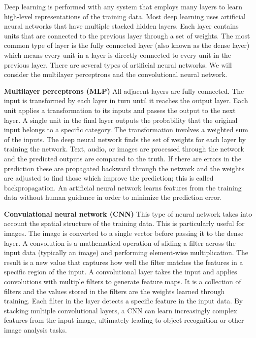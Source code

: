 \documentclass[10pt, letterpaper, twoside]{article}
\begin{document}
Deep learning is performed with any system that employs many layers to learn high-level representations of the training data. Most deep learning uses artificial neural networks that have multiple stacked hidden layers. Each layer contains units that are connected to the previous layer through a set of weights. The most common type of layer is the fully connected layer (also known as the dense layer) which means every unit in a layer is directly connected to every unit in the previous layer. There are several types of artificial neural networks. We will consider the multilayer perceptrons and the convolutional neural network.

\textbf{Multilayer perceptrons (MLP)} All adjacent layers are fully connected. The input is transformed by each layer in turn until it reaches the output layer. Each unit applies a transformation to its inputs and passes the output to the next layer. A single unit in the final layer outputs the probability that the original input belongs to a specific category. The transformation involves a weighted sum of the inputs. The deep neural network finds the set of weights for each layer by training the network. Text, audio, or images are processed through the network and the predicted outputs are compared to the truth. If there are errors in the prediction these are propagated backward through the network and the weights are adjusted to find those which improve the prediction; this is called backpropagation. An artificial neural network learns features from the training data without human guidance in order to minimize the prediction error.

\textbf{Convulational neural network (CNN)} This type of neural network takes into account the spatial structure of the training data. This is particularly useful for images. The image is converted to a single vector before passing it to the dense layer. A convolution is a mathematical operation of sliding a filter across the input data (typically an image) and performing element-wise multiplication. The result is a new value that captures how well the filter matches the features in a specific region of the input. A convolutional layer takes the input and applies convolutions with multiple filters to generate feature maps. It is a collection of filters and the values stored in the filters are the weights learned through training. Each filter in the layer detects a specific feature in the input data. By stacking multiple convolutional layers, a CNN can learn increasingly complex features from the input image, ultimately leading to object recognition or other image analysis tasks.
\end{document}
